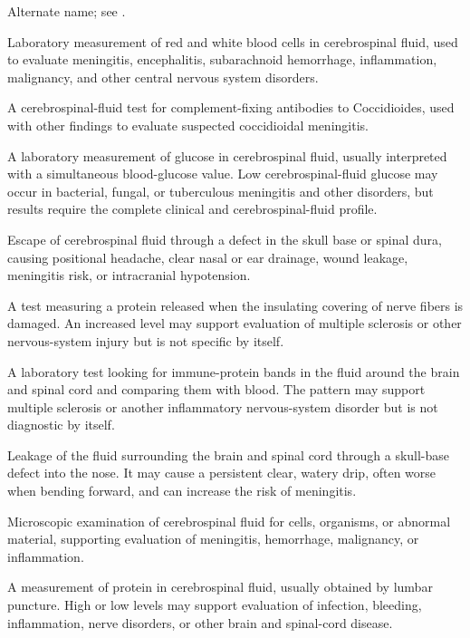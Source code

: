  Alternate name; see .

 Laboratory measurement of red and white blood cells in cerebrospinal fluid, used to evaluate meningitis, encephalitis, subarachnoid hemorrhage, inflammation, malignancy, and other central nervous system disorders.

 A cerebrospinal-fluid test for complement-fixing antibodies to Coccidioides, used with other findings to evaluate suspected coccidioidal meningitis.

 A laboratory measurement of glucose in cerebrospinal fluid, usually interpreted with a simultaneous blood-glucose value. Low cerebrospinal-fluid glucose may occur in bacterial, fungal, or tuberculous meningitis and other disorders, but results require the complete clinical and cerebrospinal-fluid profile.

 Escape of cerebrospinal fluid through a defect in the skull base or spinal dura, causing positional headache, clear nasal or ear drainage, wound leakage, meningitis risk, or intracranial hypotension.

 A test measuring a protein released when the insulating covering of nerve fibers is damaged. An increased level may support evaluation of multiple sclerosis or other nervous-system injury but is not specific by itself.

 A laboratory test looking for immune-protein bands in the fluid around the brain and spinal cord and comparing them with blood. The pattern may support multiple sclerosis or another inflammatory nervous-system disorder but is not diagnostic by itself.

 Leakage of the fluid surrounding the brain and spinal cord through a skull-base defect into the nose. It may cause a persistent clear, watery drip, often worse when bending forward, and can increase the risk of meningitis.

 Microscopic examination of cerebrospinal fluid for cells, organisms, or abnormal material, supporting evaluation of meningitis, hemorrhage, malignancy, or inflammation.

 A measurement of protein in cerebrospinal fluid, usually obtained by lumbar puncture. High or low levels may support evaluation of infection, bleeding, inflammation, nerve disorders, or other brain and spinal-cord disease.

